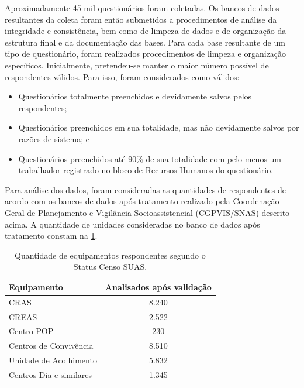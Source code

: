 \documentclass[
  brazilian]{report}
\begin{document}
Aproximadamente 45 mil questionários foram coletadas. Os bancos de dados
resultantes da coleta foram então submetidos a procedimentos de análise
da integridade e consistência, bem como de limpeza de dados e de
organização da estrutura final e da documentação das bases. Para cada
base resultante de um tipo de questionário, foram realizados
procedimentos de limpeza e organização específicos. Inicialmente,
pretendeu-se manter o maior número possível de respondentes válidos.
Para isso, foram considerados como válidos:

\begin{itemize}
\item
  Questionários totalmente preenchidos e devidamente salvos pelos
  respondentes;
\item
  Questionários preenchidos em sua totalidade, mas não devidamente
  salvos por razões de sistema; e
\item
  Questionários preenchidos até 90\% de sua totalidade com pelo menos um
  trabalhador registrado no bloco de Recursos Humanos do questionário.
\end{itemize}

Para análise dos dados, foram consideradas as quantidades de
respondentes de acordo com os bancos de dados após tratamento realizado
pela Coordenação-Geral de Planejamento e Vigilância Socioassistencial
(CGPVIS/SNAS) descrito acima. A quantidade de unidades consideradas no
banco de dados após tratamento constam na \cref{tab:qtd_equipamentos}.

\begin{table}[h]
\centering
\caption{Quantidade de equipamentos respondentes segundo o Status Censo SUAS.}
\label{tab:qtd_equipamentos}
\begin{tabular}{@{}lc@{}}
\toprule
Equipamento             & Analisados após validação \\ \midrule
CRAS                    & 8.240                     \\
CREAS                   & 2.522                     \\
Centro POP              & 230                       \\
Centros de Convivência  & 8.510                     \\
Unidade de Acolhimento  & 5.832                     \\
Centros Dia e similares & 1.345                     \\ \bottomrule
\end{tabular}
\end{table}
\end{document}
